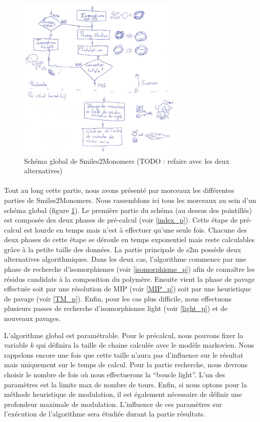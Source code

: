 \documentclass[12pt,french,twoside]{report}
\begin{document}
\begin{figure}
  \includegraphics[width=300px]{Figures/s2m/algo/s2m.pdf}
  \caption{\label{global_s2m}Schéma global de Smiles2Monomers (TODO : refaire avec les deux alternatives)}
\end{figure}

\paragraph{}Tout au long cette partie, nous avons présenté par morceaux les différentes parties de Smiles2Monomers.
Nous rassemblons ici tous les morceaux au sein d'un schéma global (figure \ref{global_s2m}).
Le première partie du schéma (au dessus des pointillés) est composée des deux phases de pré-calcul (voir \ref{index_p}).
Cette étape de pré-calcul est lourde en temps mais n'est à effectuer qu'une seule fois.
Chacune des deux phases de cette étape se déroule en temps exponentiel mais reste calculables grâce à la petite taille des
données.
La partie principale de s2m possède deux alternatives algorithmiques.
Dans les deux cas, l'algorithme commence par une phase de recherche d'isomorphismes (voir \ref{isomorphisme_p}) afin de connaître les résidus candidats à la composition du polymère.
Ensuite vient la phase de pavage effectuée soit par une résolution de MIP (voir \ref{MIP_p}) soit par une heuristique de pavage (voir \ref{TM_p}).
Enfin, pour les cas plus difficile, nous effectuons plusieurs passes de recherche d'isomorphismes light (voir \ref{light_p}) et de nouveaux pavages.

L'algorithme global est paramétrable.
Pour le précalcul, nous pouvons fixer la variable $k$ qui définira la taille de chaine calculée avec le modèle markovien.
Nous rappelons encore une fois que cette taille n'aura pas d'influence sur le résultat mais uniquement sur le temps de calcul.
Pour la partie recherche, nous devrons choisir le nombre de fois où nous effectuerons la ``boucle light''.
L'un des paramètres est la limite max de nombre de tours.
Enfin, si nous optons pour la méthode heuristique de modulation, il est également nécessaire de définir une profondeur maximale de modulation.
L'influence de ces paramètres sur l'exécution de l'algorithme sera étudiée durant la partie résultats.
\end{document}
